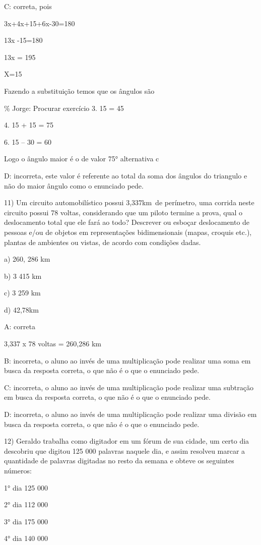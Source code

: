 {C: correta, pois

3x+4x+15+6x-30=180

13x -15=180

13x = 195

X=15

Fazendo a substituição temos que os ângulos são

\% Jorge: Procurar exercício 3. 15 = 45

4. 15 + 15 = 75

6. 15 -- 30 = 60

Logo o ângulo maior é o de valor 75° alternativa c

D: incorreta, este valor é referente ao total da soma dos ângulos do
triangulo e não do maior ângulo como o enunciado pede.

11) Um circuito automobilístico possui 3,337km~de perímetro, uma corrida
neste circuito possui 78 voltas, considerando que um piloto termine a
prova, qual o deslocamento total que ele fará ao todo? Descrever ou
esboçar deslocamento de pessoas e/ou de objetos em representações
bidimensionais (mapas, croquis etc.), plantas de ambientes ou vistas, de
acordo com condições dadas.

a) 260, 286 km

b) 3 415 km

c) 3 259 km

d) 42,78km

A: correta

3,337 x 78 voltas = 260,286 km

B: incorreta, o aluno ao invés de uma multiplicação pode realizar uma
soma em busca da resposta correta, o que não é o que o enunciado pede.

C: incorreta, o aluno ao invés de uma multiplicação pode realizar uma
subtração em busca da resposta correta, o que não é o que o enunciado
pede.

D: incorreta, o aluno ao invés de uma multiplicação pode realizar uma
divisão em busca da resposta correta, o que não é o que o enunciado
pede.

12) Geraldo trabalha como digitador em um fórum de sua cidade, um certo
dia descobriu que digitou 125 000 palavras naquele dia, e assim resolveu
marcar a quantidade de palavras digitadas no resto da semana e obteve os
seguintes números:

1° dia 125 000

2° dia 112 000

3° dia 175 000

4° dia 140 000

}
